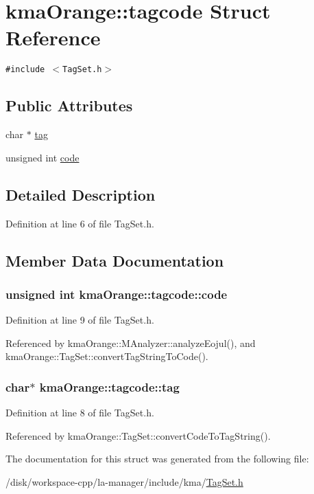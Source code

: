 \hypertarget{structkmaOrange_1_1tagcode}{
\section{kmaOrange::tagcode Struct Reference}
\label{structkmaOrange_1_1tagcode}
}
{\tt \#include $<$TagSet.h$>$}

\subsection*{Public Attributes}
\begin{CompactItemize}
\item 
char $\ast$ \hyperlink{structkmaOrange_1_1tagcode_ee44beeb743c09503f929e95da074af3}{tag}
\item 
unsigned int \hyperlink{structkmaOrange_1_1tagcode_bbee373a2488697660ed5a45bafb1676}{code}
\end{CompactItemize}


\subsection{Detailed Description}


Definition at line 6 of file TagSet.h.

\subsection{Member Data Documentation}
\hypertarget{structkmaOrange_1_1tagcode_bbee373a2488697660ed5a45bafb1676}{
\subsubsection[{code}]{\setlength{\rightskip}{0pt plus 5cm}unsigned int {\bf kmaOrange::tagcode::code}}}
\label{structkmaOrange_1_1tagcode_bbee373a2488697660ed5a45bafb1676}




Definition at line 9 of file TagSet.h.

Referenced by kmaOrange::MAnalyzer::analyzeEojul(), and kmaOrange::TagSet::convertTagStringToCode().\hypertarget{structkmaOrange_1_1tagcode_ee44beeb743c09503f929e95da074af3}{
\subsubsection[{tag}]{\setlength{\rightskip}{0pt plus 5cm}char$\ast$ {\bf kmaOrange::tagcode::tag}}}
\label{structkmaOrange_1_1tagcode_ee44beeb743c09503f929e95da074af3}




Definition at line 8 of file TagSet.h.

Referenced by kmaOrange::TagSet::convertCodeToTagString().

The documentation for this struct was generated from the following file:\begin{CompactItemize}
\item 
/disk/workspace-cpp/la-manager/include/kma/\hyperlink{TagSet_8h}{TagSet.h}\end{CompactItemize}

